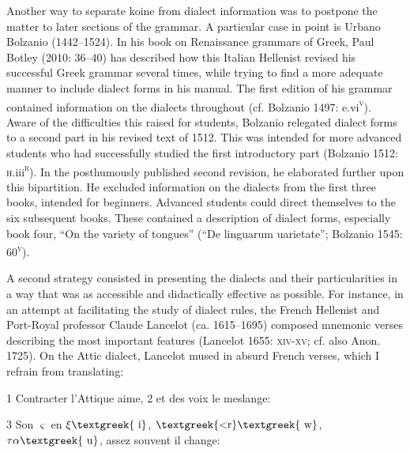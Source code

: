 \begin{styleStandard}
Another way to separate koine from dialect information was to postpone the matter to later sections of the grammar. A particular case in point is Urbano Bolzanio (1442–1524). In his book on Renaissance grammars of Greek, Paul Botley (2010: 36–40) has described how this Italian Hellenist revised his successful Greek grammar several times, while trying to find a more adequate manner to include dialect forms in his manual. The first edition of his grammar contained information on the dialects throughout (cf. Bolzanio 1497: e.vi\textsc{\textsuperscript{v}}). Aware of the difficulties this raised for students, Bolzanio relegated dialect forms to a second part in his revised text of 1512. This was intended for more advanced students who had successfully studied the first introductory part (Bolzanio 1512: \textsc{h}.iii\textsc{\textsuperscript{r}}). In the posthumously published second revision, he elaborated further upon this bipartition. He excluded information on the dialects from the first three books, intended for beginners. Advanced students could direct themselves to the six subsequent books. These contained a description of dialect forms, especially book four, “On the variety of tongues” (“De linguarum uarietate”; Bolzanio 1545: 60\textsc{\textsuperscript{v}}).
\end{styleStandard}

\begin{styleStandard}
A second strategy consisted in presenting the dialects and their particularities in a way that was as accessible and didactically effective as possible. For instance, in an attempt at facilitating the study of dialect rules, the French Hellenist and Port-Royal professor Claude Lancelot (ca. 1615–1695) composed mnemonic verses describing the most important features (Lancelot 1655: \textsc{xiv-xv; }cf. also Anon. 1725). On the Attic dialect, Lancelot mused in absurd French verses, which I refrain from translating:
\end{styleStandard}

\begin{styleQuote}
1 Contracter l’Attique aime, 2 et des voix le meslange:
\end{styleQuote}

\begin{styleQuote}
3 Son $\varsigma $ en $\xi \text{\textgreek{~i}}$, $\text{\textgreek{<r}}\text{\textgreek{~w}}$, $\tau \alpha \text{\textgreek{~u}}$, assez souvent il change:
\end{styleQuote}

